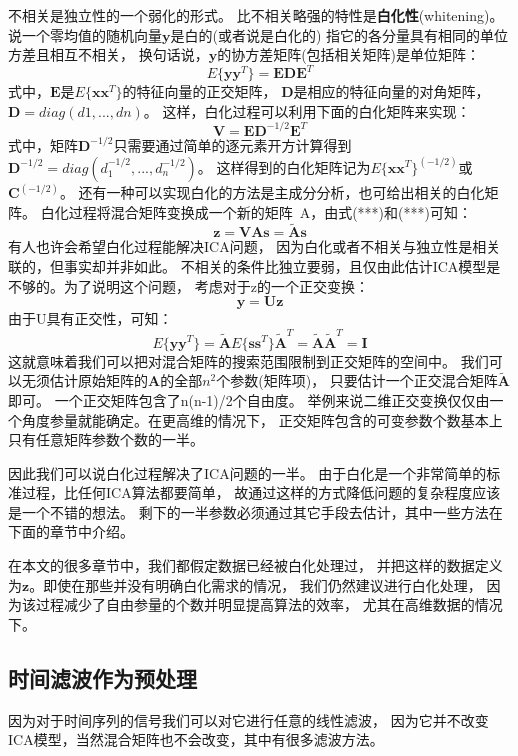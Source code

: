 不相关是独立性的一个弱化的形式。
比不相关略强的特性是\textbf{白化性}(whitening)。
说一个零均值的随机向量$\bm{y}$是白的(或者说是白化的)
指它的各分量具有相同的单位方差且相互不相关，
换句话说，$\bm{y}$的协方差矩阵(包括相关矩阵)是单位矩阵：
\begin{equation}
E\{\bm{yy}^T\}=\bm{EDE}^T
\end{equation}
式中，$\bm{E}$是$E\{\bm{xx}^T\}$的特征向量的正交矩阵，
$\bm{D}$是相应的特征向量的对角矩阵，$\bm{D}=diag(d1,...,dn)$。
这样，白化过程可以利用下面的白化矩阵来实现：
\begin{equation}
\bm{V}=\bm{ED}^{-1/2}\bm{E}^T
\end{equation}
式中，矩阵$\bm{D}^{-1/2}$只需要通过简单的逐元素开方计算得到
$\bm{D}^{-1/2}=diag(d_1^{-1/2},...,d_n^{-1/2})$。
这样得到的白化矩阵记为$E\{\bm{xx}^T\}^(-1/2)$或$\bm{C}^(-1/2)$。
还有一种可以实现白化的方法是主成分分析，也可给出相关的白化矩阵。
白化过程将混合矩阵变换成一个新的矩阵~A，由式(***)和(***)可知：
\begin{equation}
\bm{z=VAs=\tilde{A}s}
\end{equation}
有人也许会希望白化过程能解决ICA问题，
因为白化或者不相关与独立性是相关联的，但事实却并非如此。
不相关的条件比独立要弱，且仅由此估计ICA模型是不够的。为了说明这个问题，
考虑对于z的一个正交变换：
\begin{equation}
\bm{y=Uz}
\end{equation}
由于U具有正交性，可知：
\begin{equation}
E\{\bm{yy}^T\}
=\tilde{\bm{A}}E\{\bm{ss}^T\}\tilde{\bm{A}}^T
=\tilde{\bm{A}}\tilde{\bm{A}}^T=\bm{I}
\end{equation}
这就意味着我们可以把对混合矩阵的搜索范围限制到正交矩阵的空间中。
我们可以无须估计原始矩阵的$\bm{A}$的全部$n^2$个参数(矩阵项)，
只要估计一个正交混合矩阵$\tilde{\bm{A}}$即可。
一个正交矩阵包含了n(n-1)/2个自由度。
举例来说二维正交变换仅仅由一个角度参量就能确定。在更高维的情况下，
正交矩阵包含的可变参数个数基本上只有任意矩阵参数个数的一半。

因此我们可以说白化过程解决了ICA问题的一半。
由于白化是一个非常简单的标准过程，比任何ICA算法都要简单，
故通过这样的方式降低问题的复杂程度应该是一个不错的想法。
剩下的一半参数必须通过其它手段去估计，其中一些方法在下面的章节中介绍。

在本文的很多章节中，我们都假定数据已经被白化处理过，
并把这样的数据定义为$\bm{z}$。即使在那些并没有明确白化需求的情况，
我们仍然建议进行白化处理，
因为该过程减少了自由参量的个数并明显提高算法的效率，
尤其在高维数据的情况下。
   
\subsection{时间滤波作为预处理}
因为对于时间序列的信号我们可以对它进行任意的线性滤波，
因为它并不改变ICA模型，当然混合矩阵也不会改变，其中有很多滤波方法。
    
